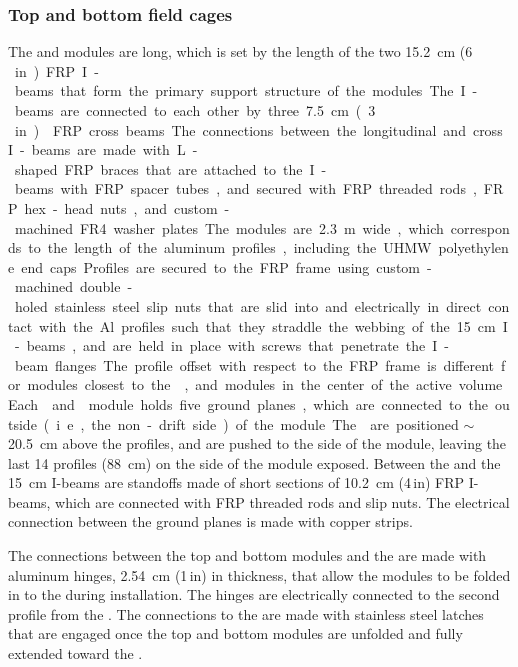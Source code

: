 \subsubsection{Top and bottom field cages}

The  and  modules are\spfcmodlen{} long, which is set by the length of the two \SI{15.2}{\cm} (\SI{6}\,in) FRP I-beams that form the primary support structure of the modules. The I-beams are connected to each other by three  \SI{7.5}{\cm} (\SI{3}\,in)  FRP cross beams. The connections between the longitudinal and cross I-beams are made with L-shaped FRP braces that are attached to the I-beams with FRP spacer tubes, and secured with FRP threaded rods, FRP hex-head nuts, and custom-machined FR4 washer plates.

The modules are \SI{2.3}{\m} wide, which corresponds to the length of the aluminum profiles, including the UHMW polyethylene end caps. Profiles are secured to the FRP frame using custom-machined double-holed stainless steel slip nuts that are slid into and electrically in direct contact with the Al profiles such that they straddle the webbing of the \SI{15}{\cm} I-beams, and are held in place with screws that penetrate the I-beam flanges. The profile offset with respect to the FRP frame is different for modules closest to the , %
and modules in the center of the active volume.

Each  and  module holds five ground planes, which are connected to the outside (i.e., the non-drift side) of the module. The  are positioned $\sim$\SI{20.5}{\cm} above the profiles, and are pushed to the  side of the module, leaving the last 14 profiles (\SI{88}{\cm}) on the  side of the module exposed. Between the  and the \SI{15}{\cm} I-beams are standoffs made of short sections of \SI{10.2}{\cm} (4\,in)  FRP I-beams, which are connected with FRP threaded rods and slip nuts. The electrical connection between the ground planes is made with copper strips.

The connections between the top and bottom modules and the  are made with aluminum hinges, \SI{2.54}{\cm} (1\,in) in thickness, that allow the modules to be folded in to the  during installation. The hinges are electrically connected to the second profile from the . The connections to the  are made with stainless steel latches that are engaged once the top and bottom modules are unfolded and fully extended toward the .

